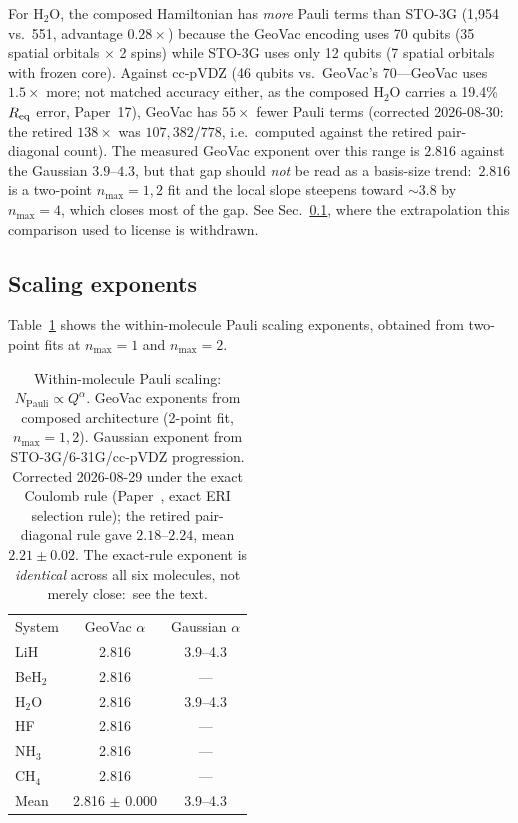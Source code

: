 \documentclass[twocolumn,pra,amsmath,amssymb,superscriptaddress]{revtex4-2}
\begin{document}
For H$_2$O, the composed Hamiltonian has \emph{more} Pauli terms than
STO-3G (1{,}954 vs.\ 551, advantage $0.28\times$) because the GeoVac
encoding uses 70 qubits (35 spatial orbitals $\times$ 2 spins) while
STO-3G uses only 12 qubits (7 spatial orbitals
with frozen core).  Against cc-pVDZ (46 qubits vs.\ GeoVac's 70---GeoVac
uses $1.5\times$ more; not matched accuracy either, as the composed
H$_2$O carries a 19.4\% $R_{\rm eq}$ error, Paper~17), GeoVac has $55\times$
fewer Pauli terms (corrected 2026-08-30: the retired $138\times$ was
$107{,}382/778$, i.e.\ computed against the retired pair-diagonal count).
The measured GeoVac exponent over this range is $2.816$ against the
Gaussian $3.9$--$4.3$, but that gap should \emph{not} be read as a
basis-size trend:\ $2.816$ is a two-point $n_{\max} = 1, 2$ fit and the
local slope steepens toward $\sim\!3.8$ by $n_{\max} = 4$, which closes
most of the gap.  See Sec.~\ref{sec:scaling_exponents}, where the
extrapolation this comparison used to license is withdrawn.

\subsection{Scaling exponents}
\label{sec:scaling_exponents}

Table~\ref{tab:scaling} shows the within-molecule Pauli scaling exponents,
obtained from two-point fits at $n_{\max}=1$ and $n_{\max}=2$.

\begin{table}[h]
\caption{Within-molecule Pauli scaling: $N_{\text{Pauli}} \propto Q^{\alpha}$.
  GeoVac exponents from composed architecture (2-point fit,
  $n_{\max}=1,2$).  Gaussian exponent from STO-3G/6-31G/cc-pVDZ
  progression.  Corrected 2026-08-29 under the exact Coulomb rule
  (Paper~\cite{GeoVac_Paper14}, exact ERI selection rule); the retired pair-diagonal rule
  gave $2.18$--$2.24$, mean $2.21 \pm 0.02$.  The exact-rule exponent is
  \emph{identical} across all six molecules, not merely close:\ see the
  text.}
\label{tab:scaling}
\begin{ruledtabular}
\begin{tabular}{lcc}
System & GeoVac $\alpha$ & Gaussian $\alpha$ \\
\colrule
LiH    & 2.816 & 3.9--4.3 \\
BeH$_2$ & 2.816 & --- \\
H$_2$O  & 2.816 & 3.9--4.3 \\
HF     & 2.816 & --- \\
NH$_3$  & 2.816 & --- \\
CH$_4$  & 2.816 & --- \\
\colrule
Mean   & 2.816 $\pm$ 0.000 & 3.9--4.3 \\
\end{tabular}
\end{ruledtabular}
\end{table}
\end{document}
